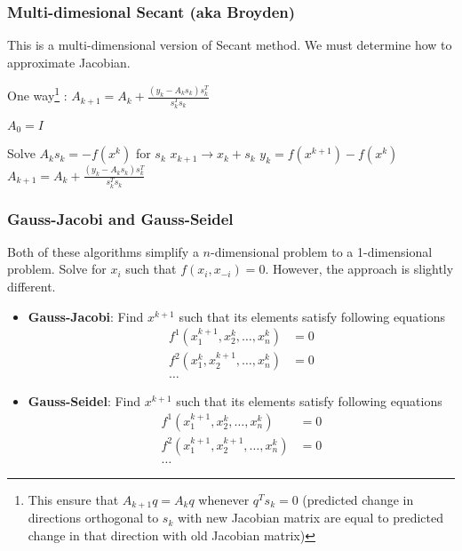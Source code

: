 \documentclass[10pt]{beamer}
\begin{document}
\begin{frame} \frametitle{Multi-dimesional Secant (aka Broyden)}

  This is a multi-dimensional version of Secant method. We must determine how to approximate Jacobian.

  One way\footnote{This ensure that $A_{k+1} q = A_k q$ whenever $q^T s_k = 0$ (predicted change in directions orthogonal to $s_k$ with new Jacobian matrix are equal to predicted change in that direction with old Jacobian matrix)}
: $A_{k+1} = A_k + \frac{(y_k - A_k s_k) s_k^T}{s_k^T s_k}$

  \vspace{0.3cm}

  \begin{algorithmic}

    \STATE $A_0 = I$

    \STATE Solve $A_k s_k = - f(x^k)$ for $s_k$
    \STATE $x_{k+1} \rightarrow x_k + s_k$
    \STATE $y_k = f(x^{k+1}) - f(x^k)$
    \STATE $A_{k+1} = A_k + \frac{(y_k - A_k s_k) s_k^T}{s_k^T s_k}$
    \ENDWHILE

  \end{algorithmic}

\end{frame}

\begin{frame} \frametitle{Gauss-Jacobi and Gauss-Seidel}

  Both of these algorithms simplify a $n$-dimensional problem to a 1-dimensional problem. Solve for $x_i$ such that $f(x_i, x_{-i}) = 0$. However, the approach is slightly different.

  \begin{itemize}
    \item \textbf{Gauss-Jacobi}: Find $x^{k+1}$ such that its elements satisfy following equations
    \begin{align*}
      f^1(x_1^{k+1}, x_2^k, \dots, x_n^k) &= 0 \\
      f^2(x_1^{k}, x_2^{k+1}, \dots, x_n^k) &= 0 \\
      \dots
    \end{align*}
    \item \textbf{Gauss-Seidel}: Find $x^{k+1}$ such that its elements satisfy following equations
    \begin{align*}
      f^1(x_1^{k+1}, x_2^k, \dots, x_n^k) &= 0 \\
      f^2(x_1^{k+1}, x_2^{k+1}, \dots, x_n^k) &= 0 \\
      \dots
    \end{align*}
  \end{itemize}

\end{frame}
\end{document}
